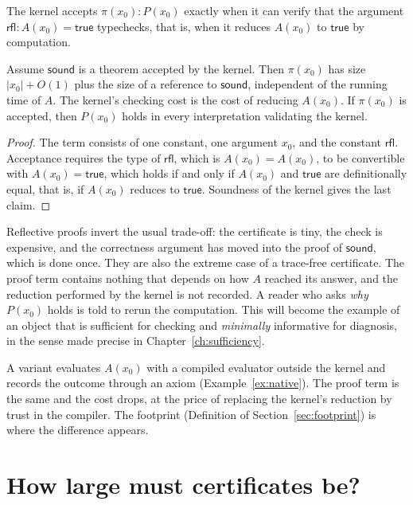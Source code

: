 The kernel accepts $\pi(x_0):P(x_0)$ exactly when it can verify that the argument $\mathsf{rfl}:A(x_0)=\mathsf{true}$ typechecks, that is, when it reduces $A(x_0)$ to $\mathsf{true}$ by computation.

\begin{theorem}
\label{thm:reflection}
Assume $\mathsf{sound}$ is a theorem accepted by the kernel. Then $\pi(x_0)$ has size $|x_0|+O(1)$ plus the size of a reference to $\mathsf{sound}$, independent of the running time of $A$. The kernel's checking cost is the cost of reducing $A(x_0)$. If $\pi(x_0)$ is accepted, then $P(x_0)$ holds in every interpretation validating the kernel.
\end{theorem}

\begin{proof}
The term consists of one constant, one argument $x_0$, and the constant $\mathsf{rfl}$. Acceptance requires the type of $\mathsf{rfl}$, which is $A(x_0)=A(x_0)$, to be convertible with $A(x_0)=\mathsf{true}$, which holds if and only if $A(x_0)$ and $\mathsf{true}$ are definitionally equal, that is, if $A(x_0)$ reduces to $\mathsf{true}$. Soundness of the kernel gives the last claim.
\end{proof}

Reflective proofs invert the usual trade-off: the certificate is tiny, the check is expensive, and the correctness argument has moved into the proof of $\mathsf{sound}$, which is done once. They are also the extreme case of a trace-free certificate. The proof term contains nothing that depends on how $A$ reached its answer, and the reduction performed by the kernel is not recorded. A reader who asks \emph{why} $P(x_0)$ holds is told to rerun the computation. This will become the example of an object that is sufficient for checking and \emph{minimally} informative for diagnosis, in the sense made precise in Chapter~\ref{ch:sufficiency}.

A variant evaluates $A(x_0)$ with a compiled evaluator outside the kernel and records the outcome through an axiom (Example~\ref{ex:native}). The proof term is the same and the cost drops, at the price of replacing the kernel's reduction by trust in the compiler. The footprint (Definition of Section~\ref{sec:footprint}) is where the difference appears.

\section{How large must certificates be?}
\label{sec:cook-reckhow}

